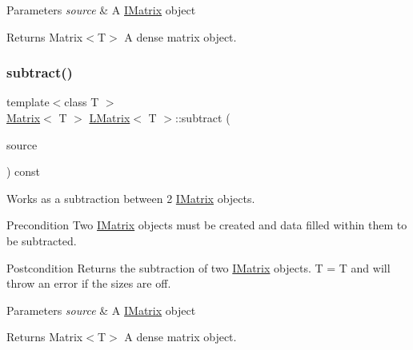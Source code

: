 \begin{DoxyParams}{Parameters}
{\em source} & A \mbox{\hyperlink{class_i_matrix}{I\+Matrix}} object \\
\hline
\end{DoxyParams}
\begin{DoxyReturn}{Returns}
Matrix$<$\+T$>$ A dense matrix object. 
\end{DoxyReturn}
\mbox{\label{class_l_matrix_ab86a9c648460e127961b32c5dd18b7b2}} 
\subsubsection{\texorpdfstring{subtract()}{subtract()}\hspace{0.1cm}{\footnotesize\ttfamily [2/6]}}
{\footnotesize\ttfamily template$<$class T $>$ \\
\mbox{\hyperlink{class_matrix}{Matrix}}$<$ T $>$ \mbox{\hyperlink{class_l_matrix}{L\+Matrix}}$<$ T $>$\+::subtract (\begin{DoxyParamCaption}\item[{const \mbox{\hyperlink{class_i_matrix}{I\+Matrix}}$<$ \mbox{\hyperlink{class_t_matrix}{T\+Matrix}}$<$ T $>$, T $>$ \&}]{source }\end{DoxyParamCaption}) const}



Works as a subtraction between 2 \mbox{\hyperlink{class_i_matrix}{I\+Matrix}} objects. 

\begin{DoxyPrecond}{Precondition}
Two \mbox{\hyperlink{class_i_matrix}{I\+Matrix}} objects must be created and data filled within them to be subtracted. 
\end{DoxyPrecond}
\begin{DoxyPostcond}{Postcondition}
Returns the subtraction of two \mbox{\hyperlink{class_i_matrix}{I\+Matrix}} objects. T = T and will throw an error if the sizes are off.
\end{DoxyPostcond}

\begin{DoxyParams}{Parameters}
{\em source} & A \mbox{\hyperlink{class_i_matrix}{I\+Matrix}} object \\
\hline
\end{DoxyParams}
\begin{DoxyReturn}{Returns}
Matrix$<$\+T$>$ A dense matrix object. 
\end{DoxyReturn}
\mbox{\label{class_l_matrix_af215feeb6856f0dbe4800f8071c6013c}} 
